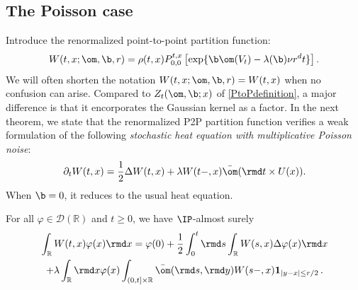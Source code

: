\subsection{The Poisson case}
Introduce the renormalized point-to-point partition function:
\begin{equation} \label{eq:renormalizedP2Pdef}
W(t,x;\om,\b,r) = \rho(t,x) P_{0,0}^{t,x}\left[ \exp \{ \b \om(V_t)-\lambda(\b) \nu r^d t\}\right].
\end{equation}
We will often shorten the notation $W(t,x;\om,\b,r) =W(t,x) $ when no confusion can arise. Compared to $Z_t(\om, \b; x)$ of \eqref{PtoPdefinition}, a major difference is that it encorporates the Gaussian kernel as a factor.
In the next theorem, we state that the renormalized P2P partition function verifies a weak formulation of the following \emph{stochastic heat equation with multiplicative Poisson noise}:
\begin{equation}
\partial_t W(t,x) = \frac{1}{2} \Delta W(t,x) + \lambda W(t-,x) \bar{\om}(\rmd t \times U(x)).
\end{equation}
When $\b=0$, it reduces to the usual heat equation.
\begin{theorem}\label{th:she}
 For all $\varphi\in \mathcal{D}(\mathbb R)$ and $t\geq 0$, we have $\IP$-almost surely
\begin{multline} \label{eq:sheForPoisson}
\int_\mathbb{R} W(t,x)\varphi(x) \rmd x = \varphi(0) + \frac{1}{2}\int_0^t \rmd s \int_\mathbb{R} W(s,x) \Delta \varphi (x) \rmd x \\
+ \lambda \int_{\mathbb{R}} \rmd x \varphi(x) \int_{(0,t]\times \mathbb R} \bar{\om}(\rmd s, \rmd y) W(s-,x) \mathbf{1}_{|y-x|\leq r/2} \,.
\end{multline}
\end{theorem}
